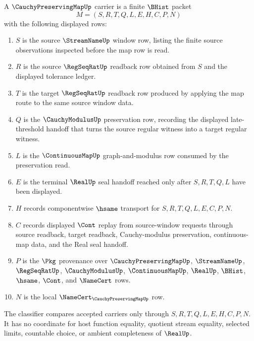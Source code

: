 \begin{definition}
\label{def:cauchy-preserving-map-carrier}
A $\CauchyPreservingMapUp$ carrier is a finite $\BHist$ packet
$$
M=(S,R,T,Q,L,E,H,C,P,N)
$$
with the following displayed rows:
\begin{enumerate}
\item $S$ is the source $\StreamNameUp$ window row, listing the finite source observations inspected before the map row is read.
\item $R$ is the source $\RegSeqRatUp$ readback row obtained from $S$ and the displayed tolerance ledger.
\item $T$ is the target $\RegSeqRatUp$ readback row produced by applying the map route to the same source window data.
\item $Q$ is the $\CauchyModulusUp$ preservation row, recording the displayed late-threshold handoff that turns the source regular witness into a target regular witness.
\item $L$ is the $\ContinuousMapUp$ graph-and-modulus row consumed by the preservation read.
\item $E$ is the terminal $\RealUp$ seal handoff reached only after $S,R,T,Q,L$ have been displayed.
\item $H$ records componentwise $\hsame$ transport for $S,R,T,Q,L,E,C,P,N$.
\item $C$ records displayed $\Cont$ replay from source-window requests through source readback, target readback, Cauchy-modulus preservation, continuous-map data, and the Real seal handoff.
\item $P$ is the $\Pkg$ provenance over $\CauchyPreservingMapUp$, $\StreamNameUp$, $\RegSeqRatUp$, $\CauchyModulusUp$, $\ContinuousMapUp$, $\RealUp$, $\BHist$, $\hsame$, $\Cont$, and $\NameCert$ rows.
\item $N$ is the local $\NameCert_{\CauchyPreservingMapUp}$ row.
\end{enumerate}
The classifier compares accepted carriers only through $S,R,T,Q,L,E,H,C,P,N$. It has no coordinate for host function equality, quotient stream equality, selected limits, countable choice, or ambient completeness of $\RealUp$.
\end{definition}

